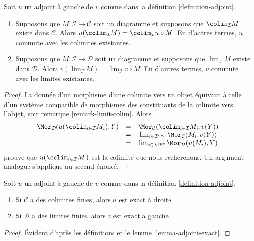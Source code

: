 \begin{lemma}
\label{lemma-adjoint-exact}
Soit $u$ un adjoint à gauche de $v$ comme dans la définition
\ref{definition-adjoint}.
\begin{enumerate}
\item Supposons que $M : \mathcal{I} \to \mathcal{C}$ soit un diagramme et
supposons que $\colim_\mathcal{I} M$ existe dans $\mathcal{C}$. Alors
$u(\colim_\mathcal{I} M) =
\colim_\mathcal{I} u \circ M$. En d'autres termes,
$u$ commute avec les colimites existantes.
\item Supposons que $M : \mathcal{I} \to \mathcal{D}$ soit un diagramme et
supposons que $\lim_\mathcal{I} M$ existe dans $\mathcal{D}$. Alors
$v(\lim_\mathcal{I} M) =
\lim_\mathcal{I} v \circ M$. En d'autres termes, $v$
commute avec les limites existantes.
\end{enumerate}
\end{lemma}

\begin{proof}
La donnée d'un morphisme d'une colimite vers un objet équivaut à celle d'un
système compatible de morphismes des constituants de la colimite vers l'objet, voir
remarque \ref{remark-limit-colim}. Alors
$$
\begin{matrix}
\Mor_\mathcal{D}(u(\colim_{i \in \mathcal{I}} M_i), Y) &
= & \Mor_\mathcal{C}(\colim_{i \in \mathcal{I}} M_i, v(Y)) \\
& = &
\lim_{i \in \mathcal{I}^{opp}}
\Mor_\mathcal{C}(M_i, v(Y)) \\
& = &
\lim_{i \in \mathcal{I}^{opp}}
\Mor_\mathcal{D}(u(M_i), Y)
\end{matrix}
$$
prouve que $u(\colim_{i \in \mathcal{I}} M_i)$ est la colimite que nous
recherchons. Un argument analogue s'applique au second énoncé.
\end{proof}

\begin{lemma}
\label{lemma-exact-adjoint}
Soit $u$ un adjoint à gauche de $v$ comme dans la définition
\ref{definition-adjoint}.
\begin{enumerate}
\item Si $\mathcal{C}$ a des colimites finies, alors $u$ est exact à droite.
\item Si $\mathcal{D}$ a des limites finies, alors $v$ est exact à gauche.
\end{enumerate}
\end{lemma}

\begin{proof}
Évident d’après les définitions et le lemme \ref{lemma-adjoint-exact}.
\end{proof}

